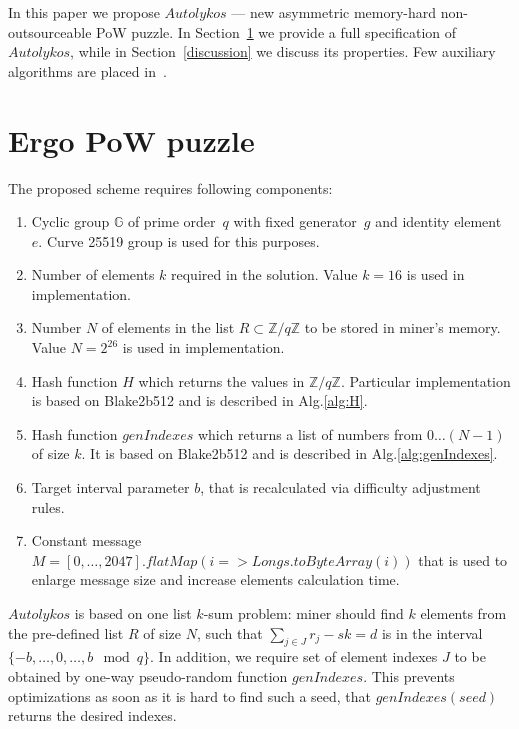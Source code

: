 \documentclass[]{article}
\newcommand{\Name}{$Autolykos$}
\begin{document}
    In this paper we propose \Name{} --- new asymmetric memory-hard non-outsourceable PoW puzzle.
    In Section~\ref{puzzle} we provide a full
    specification of \Name, while in Section~\ref{discussion} we discuss its
    properties. Few auxiliary algorithms are placed in~.

    \section{Ergo PoW puzzle}
    \label{puzzle}

    The proposed scheme requires following components:
    \begin{enumerate}
        \item Cyclic group $\mathbb{G}$ of prime order~$q$ with fixed generator~$g$
        and identity element~$e$.
        Curve 25519 group is used for this purposes.
        \item Number of elements $k$ required in the solution. Value $k=16$ is used in
            implementation.
        \item Number $N$ of elements in the list
            $R\subset\mathbb{Z}/q\mathbb{Z}$ to be stored in miner's memory.
            Value $N=2^{26}$ is used in implementation.
        \item Hash function $H$ which returns the values in $\mathbb{Z}/q\mathbb{Z}$.
        Particular implementation is based on Blake2b512 and is described in Alg.\ref{alg:H}.
        \item Hash function $genIndexes$ which returns a list of numbers from
            $0\dots(N-1)$ of size $k$.
        It is based on Blake2b512 and is described in Alg.\ref{alg:genIndexes}.
        \item Target interval parameter $b$, that is recalculated via difficulty adjustment rules.
        \item Constant message $M=[0,\dots,2047].flatMap(i => Longs.toByteArray(i))$ that is used to enlarge message size and increase elements calculation time.
    \end{enumerate}

    \Name{} is based on one list $k$-sum problem: miner should find
    $k$ elements from the pre-defined list $R$ of size $N$, such that
    $\sum_{j \in J} r_{j} - sk = d$ is in the interval $\{-b,\dots,0,\dots,b\mod q\}$.
    In addition, we require set of element indexes $J$ to be obtained
    by one-way pseudo-random function $genIndexes$. This prevents optimizations as
    soon as it is hard to find such a seed,
    that $genIndexes(seed)$ returns the desired indexes.
\end{document}
